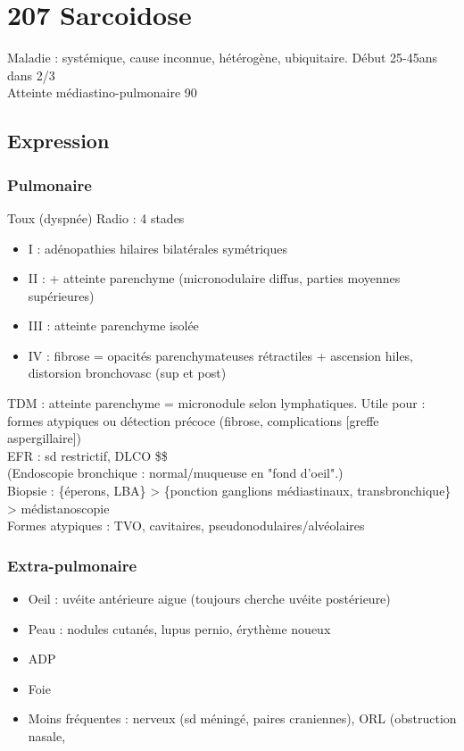 \documentclass{book}
\begin{document}
\section{207 \textdagger{} Sarcoidose}
\label{sec:org25cfd5e}
Maladie : systémique, cause inconnue, hétérogène, ubiquitaire. Début 25-45ans
dans 2/3\\
Atteinte médiastino-pulmonaire 90

\subsection{Expression}
\label{sec:org8bb5266}
\label{sec:org39048da}
\subsubsection{Pulmonaire}
\label{sec:orgdaaf19d}
\label{sec:org4ec1d7e}
Toux (dyspnée)
Radio : 4 stades

\begin{itemize}
\item I : adénopathies hilaires bilatérales symétriques
\item II : + atteinte parenchyme (micronodulaire diffus, parties moyennes supérieures)
\item III : atteinte parenchyme isolée
\item IV : fibrose = opacités parenchymateuses rétractiles + ascension hiles, distorsion bronchovasc (sup et post)
\end{itemize}

TDM : atteinte parenchyme = micronodule selon lymphatiques. Utile pour : formes atypiques ou détection précoce (fibrose, complications [greffe aspergillaire])\\
EFR : sd restrictif, DLCO \$\searrow\$\\
(Endoscopie bronchique : normal/muqueuse en "fond d'oeil".)\\
Biopsie : \{éperons, LBA\} > \{ponction ganglions médiastinaux, transbronchique\} > médistanoscopie\\
Formes atypiques : TVO, cavitaires, pseudonodulaires/alvéolaires

\subsubsection{Extra-pulmonaire}
\label{sec:org62a50af}
\label{sec:org316c190}

\begin{itemize}
\item Oeil : uvéite antérieure aigue (toujours cherche uvéite postérieure)
\item Peau : nodules cutanés, lupus pernio, érythème noueux
\item ADP
\item Foie
\item Moins fréquentes : nerveux (sd méningé, paires craniennes), ORL (obstruction
nasale,
\end{itemize}
\end{document}
